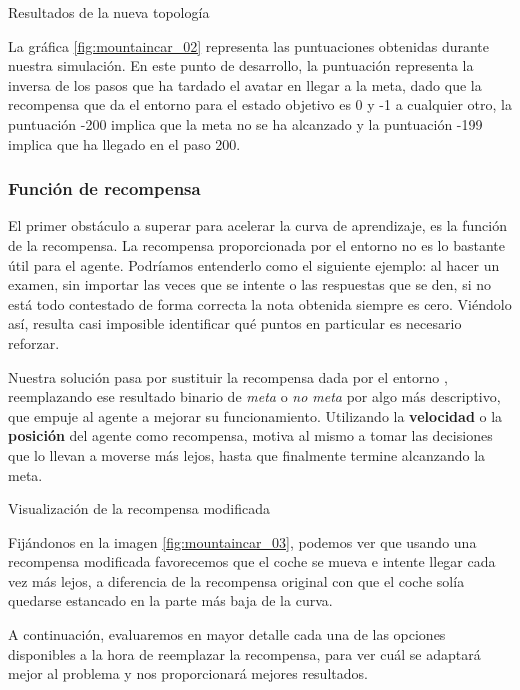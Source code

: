 %
       {Resultados de la nueva topología}

La gráfica \ref{fig:mountaincar_02} representa las puntuaciones obtenidas durante nuestra simulación. En este punto de desarrollo, la puntuación representa la inversa de los pasos que ha tardado el avatar en llegar a la meta, dado que la recompensa que da el entorno para el estado objetivo es 0 y -1 a cualquier otro, la puntuación -200 implica que la meta no se ha alcanzado y la puntuación -199 implica que ha llegado en el paso 200. 

\subsubsection{Función de recompensa}

El primer obstáculo a superar para acelerar la curva de aprendizaje, es la función de la recompensa. La recompensa proporcionada por el entorno no es lo bastante útil para el agente. Podríamos entenderlo como el siguiente ejemplo: al hacer un examen, sin importar las veces que se intente o las respuestas que se den, si no está todo contestado de forma correcta la nota obtenida siempre es cero. Viéndolo así, resulta casi imposible identificar qué puntos en particular es necesario reforzar.

Nuestra solución pasa por sustituir la recompensa dada por el entorno \citep{mediumTim}, reemplazando ese resultado binario de \textit{meta} o \textit{no meta} por algo más descriptivo, que empuje al agente a mejorar su funcionamiento. Utilizando la \textbf{velocidad} o la \textbf{posición} del agente como recompensa, motiva al mismo a tomar las decisiones que lo llevan a moverse más lejos, hasta que finalmente termine alcanzando la meta.

%
       {Visualización de la recompensa modificada}

Fijándonos en la imagen \ref{fig:mountaincar_03}, podemos ver que usando una recompensa modificada favorecemos que el coche se mueva e intente llegar cada vez más lejos, a diferencia de la recompensa original con que el coche solía quedarse estancado en la parte más baja de la curva.

A continuación, evaluaremos en mayor detalle cada una de las opciones disponibles a la hora de reemplazar la recompensa, para ver cuál se adaptará mejor al problema y nos proporcionará mejores resultados.



